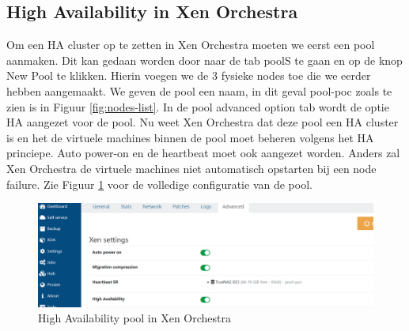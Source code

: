 \subsection{High Availability in Xen Orchestra}
\label{sec:ha-orch}
Om een HA cluster op te zetten in Xen Orchestra moeten we eerst een pool aanmaken. Dit kan gedaan worden door naar de tab poolS te gaan en op de knop New Pool te klikken.
Hierin voegen we de 3 fysieke nodes toe die we eerder hebben aangemaakt. We geven de pool een naam, in dit geval pool-poc zoals te zien is in Figuur \ref{fig:nodes-list}.
In de pool advanced option tab wordt de optie HA aangezet voor de pool. Nu weet Xen Orchestra dat deze pool een HA cluster is en het de virtuele machines binnen de pool moet beheren volgens het HA princiepe.
Auto power-on en de heartbeat moet ook aangezet worden. Anders zal Xen Orchestra de virtuele machines niet automatisch opstarten bij een node failure. Zie Figuur \ref{fig:ha-settings-orch.png} voor de volledige configuratie van de pool.
\begin{figure}[H]
  \centering
  \includegraphics[width=1.1\textwidth, trim=0cm 0cm 10cm 0cm, clip]{../poc/ha-settings-orch.png}
  \caption{High Availability pool in Xen Orchestra}
  \label{fig:ha-settings-orch.png}
\end{figure}